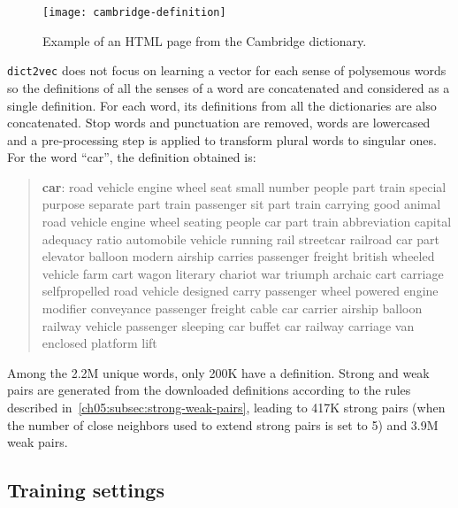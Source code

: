     \begin{figure}[h]
      \centering
      \texttt{[image: cambridge-definition]}
      \caption{Example of an HTML page from the Cambridge dictionary.}
      \label{fig:cambrige}
    \end{figure}

    \noindent \texttt{dict2vec} does not focus on learning a vector for each
    sense of polysemous words so the definitions of all the senses of a word are
    concatenated and considered as a single definition. For each word, its
    definitions from all the dictionaries are also concatenated. Stop words and
    punctuation are removed, words are lowercased and a pre-processing step is
    applied to transform plural words to singular ones. For the word ``car'',
    the definition obtained is:

    \begin{quote}
      \small
      \textbf{car}: road vehicle engine wheel seat small number people part
      train special purpose separate part train passenger sit part train
      carrying good animal road vehicle engine wheel seating people car part
      train abbreviation capital adequacy ratio automobile vehicle running rail
      streetcar railroad car part elevator balloon modern airship carries
      passenger freight british wheeled vehicle farm cart wagon
      literary chariot war triumph archaic cart carriage selfpropelled road
      vehicle designed carry passenger wheel powered engine modifier
      conveyance passenger freight cable car carrier airship balloon railway
      vehicle passenger sleeping car buffet car railway carriage van enclosed
      platform lift
    \end{quote}

    \noindent Among the 2.2M unique words, only 200K have a definition. Strong
    and weak pairs are generated from the downloaded definitions according to
    the rules described in~\autoref{ch05:subsec:strong-weak-pairs}, leading to
    417K strong pairs (when the number of close neighbors used to extend strong
    pairs is set to 5) and 3.9M weak pairs.

  \subsection{Training settings}
    \label{ch05:subsec:training-settings}
